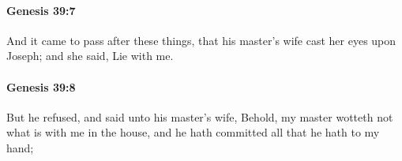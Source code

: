 		\paragraph{Genesis 39:7} %
			\label{GENESIS-39-7}

			And it came to pass after these things, that his master's wife cast her eyes upon Joseph; and she said, Lie with me.


		\paragraph{Genesis 39:8} %
			\label{GENESIS-39-8}

			But he refused, and said unto his master's wife, Behold, my master wotteth not what is with me in the house, and he hath committed all that he hath to my hand;


